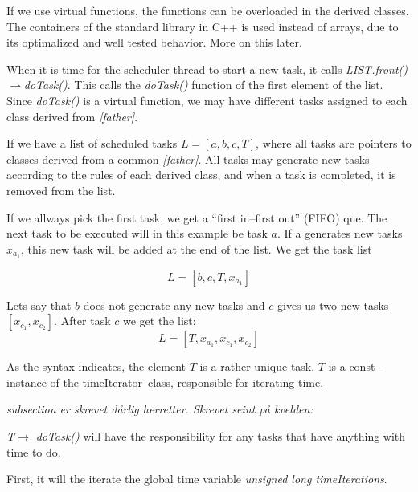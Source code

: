 If we use virtual functions, the functions can be overloaded in the derived classes.%
The containers of the standard library in C++ is used instead of arrays, due to its optimalized and well tested behavior\cite{Stroustrup2000KAP16}. More on this later. %

When it is time for the scheduler-thread to start a new task, it calls \emph{LIST.front()$\rightarrow$doTask()}. 
This calls the \emph{doTask()} function of the first element of the list.
Since \emph{doTask()} is a virtual function, we may have different tasks assigned to each class derived from \emph{[father]}.

If we have a list of scheduled tasks $L = [a, b, c, T]$, where all tasks are pointers to classes derived from a common \emph{[father]}. 
All tasks may generate new tasks according to the rules of each derived class, and when a task is completed, it is removed from the list.

If we allways pick the first task, we get a ``first in--first out'' (FIFO) que. The next task to be executed will in this example be task $a$. %
If a generates new tasks $x_{a_1}$, this new task will be added at the end of the list. We get the task list

\begin{equation}
	\nonumber
	L = [b, c, T, x_{a_1}]
\end{equation}

Lets say that $b$ does not generate any new tasks and $c$ gives us two new tasks $[x_{c_1}, x_{c_2}]$. After task $c$ we get the list:
\begin{equation}
	\nonumber
	L = [T, x_{a_1}, x_{c_1}, x_{c_2} ]
\end{equation}

As the syntax indicates, the element $T$ is a rather unique task. $T$ is a const--instance of the timeIterator--class, responsible for iterating time.

\large{\emph{subsection{} er skrevet dårlig herretter. Skrevet seint på kvelden:}} %

\emph{T$\rightarrow$ doTask()} will have the responsibility for any tasks that have anything with time to do. 

First, it will the iterate the global time variable \emph{unsigned long timeIterations}.

